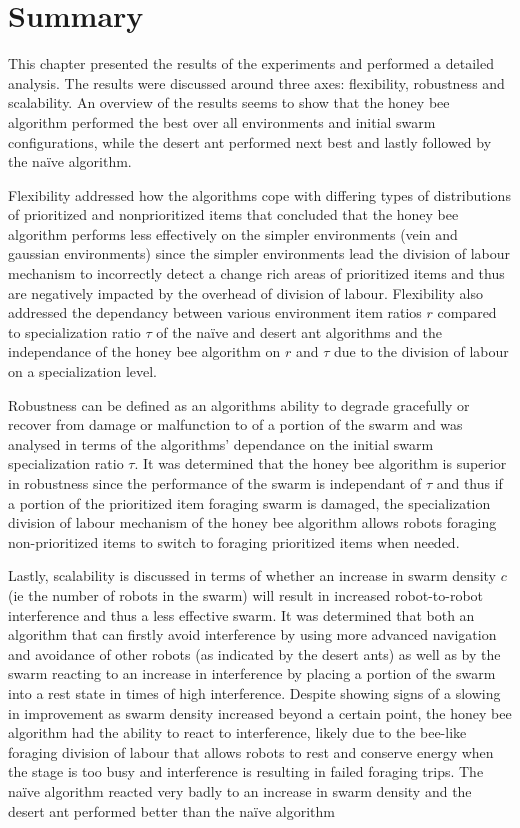 \section{Summary}
\label{results:summary}

This chapter presented the results of the experiments and performed a detailed analysis. The results were discussed around three axes: flexibility, robustness and scalability. An overview of the results seems to show that the honey bee algorithm performed the best over all environments and initial swarm configurations, while the desert ant performed next best and lastly followed by the na\"ive algorithm. 

Flexibility addressed how the algorithms cope with differing types of distributions of prioritized and nonprioritized items that concluded that the honey bee algorithm performs less effectively on the simpler environments (vein and gaussian environments) since the simpler environments lead the division of labour mechanism to incorrectly detect a change rich areas of prioritized items and thus are negatively impacted by the overhead of division of labour. Flexibility also addressed the dependancy between various environment item ratios $r$ compared to specialization ratio $\tau$ of the na\"ive and desert ant algorithms and the independance of the honey bee algorithm on $r$ and $\tau$ due to the division of labour on a specialization level. 

Robustness can be defined as an algorithms ability to degrade gracefully or recover from damage or malfunction to of a portion of the swarm and was analysed in terms of the algorithms' dependance on the initial swarm specialization ratio $\tau$. It was determined that the honey bee algorithm is superior in robustness since the performance of the swarm is independant of $\tau$ and thus if a portion of the prioritized item foraging swarm is damaged, the specialization division of labour mechanism of the honey bee algorithm allows robots foraging non-prioritized items to switch to foraging prioritized items when needed.

Lastly, scalability is discussed in terms of whether an increase in swarm density $c$ (ie the number of robots in the swarm) will result in increased robot-to-robot interference and thus a less effective swarm. It was determined that both an algorithm that can firstly avoid interference by using more advanced navigation and avoidance of other robots (as indicated by the desert ants) as well as by the swarm reacting to an increase in interference by placing a portion of the swarm into a rest state in times of high interference. Despite showing signs of a slowing in improvement as swarm density increased beyond a certain point, the honey bee algorithm had the ability to react to interference, likely due to the bee-like foraging division of labour that allows robots to rest and conserve energy when the stage is too busy and interference is resulting in failed foraging trips. The na\"ive algorithm reacted very badly to an increase in swarm density and the desert ant performed better than the na\"ive algorithm 

